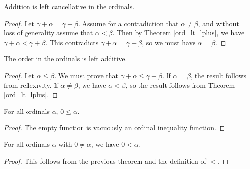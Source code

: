 \documentclass[../../math.tex]{subfiles}
\begin{document}
\begin{instance}
    Addition is left cancellative in the ordinals.
\end{instance}
\begin{proof}
    Let $\gamma + \alpha = \gamma + \beta$.  Assume for a contradiction that
    $\alpha \neq \beta$, and without loss of generality assume that $\alpha <
    \beta$.  Then by Theorem \ref{ord_lt_lplus}, we have $\gamma + \alpha <
    \gamma + \beta$.  This contradicts $\gamma + \alpha = \gamma + \beta$, so we
    must have $\alpha = \beta$.
\end{proof}

\begin{instance}
    The order in the ordinals is left additive.
\end{instance}
\begin{proof}
    Let $\alpha \leq \beta$.  We must prove that $\gamma + \alpha \leq \gamma +
    \beta$.  If $\alpha = \beta$, the result follows from reflexivity.  If
    $\alpha \neq \beta$, we have $\alpha < \beta$, so the result follows from
    Theorem \ref{ord_lt_lplus}.
\end{proof}

\begin{theorem} \label{ord_pos}
    For all ordinals $\alpha$, $0 \leq \alpha$.
\end{theorem}
\begin{proof}
    The empty function is vacuously an ordinal inequality function.
\end{proof}

\begin{theorem} \label{ord_pos2}
    For all ordinals $\alpha$ with $0 \neq \alpha$, we have $0 < \alpha$.
\end{theorem}
\begin{proof}
    This follows from the previous theorem and the definition of $<$.
\end{proof}
\end{document}
